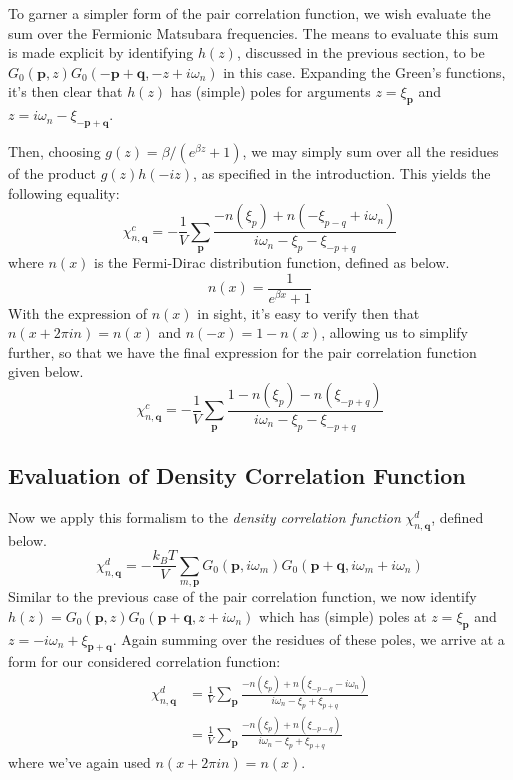 \documentclass[10pt,a4paper]{article}
\begin{document}
\begin{multicols}{2}
To garner a simpler form of the pair correlation function, we wish evaluate the sum over the Fermionic Matsubara frequencies. The means to evaluate this sum is made explicit by identifying $h(z)$, discussed in the previous section, to be $G_{0}(\mathbf{p},z)G_0(-\mathbf{p}+\mathbf{q},-z+i\omega_n)$ in this case. Expanding the Green's functions, it's then clear that $h(z)$ has (simple) poles for arguments $z=\xi_{\mathbf{p}}$ and $z=i\omega_n-\xi_{-\mathbf{p}+\mathbf{q}}$.

Then, choosing $g(z)=\beta/(e^{\beta z}+1)$, we may simply sum over all the residues of the product $g(z)h(-iz)$, as specified in the introduction. This yields the following equality:
$$
\chi_{n,\mathbf{q}}^c = -\frac{1}{V}\sum_{\mathbf{p}}\frac{-n(\xi_{p})+n(-\xi_{p-q}+i\omega_n)}{i\omega_n - \xi_{p}-\xi_{-p+q}}
$$
where $n(x)$ is the Fermi-Dirac distribution function, defined as below.
$$
n(x)=\frac{1}{e^{\beta x}+1}
$$
With the expression of $n(x)$ in sight, it's easy to verify then that  $n(x+2\pi i n  )=n(x)$ and $n(-x)=1-n(x)$, allowing us to simplify further, so that we have the final expression for the pair correlation function given below.
$$
\chi_{n,\mathbf{q}}^c = -\frac{1}{V}\sum_{\mathbf{p}}\frac{1-n(\xi_{p})-n(\xi_{-p+q})}{i\omega_n - \xi_{p}-\xi_{-p+q}}
$$
\subsection{Evaluation of Density Correlation Function}
Now we apply this formalism to the \textit{density correlation function} $\chi_{n,\mathbf{q}}^d$, defined below.\small
$$
\chi_{n,\mathbf{q}}^d = -\frac{k_BT}{V}\sum_{m,\mathbf{p}}G_{0}(\mathbf{p},i\omega_m)G_0(\mathbf{p}+\mathbf{q},i\omega_m+i\omega_n)
$$\normalsize
Similar to the previous case of the pair correlation function, we now identify $h(z)=G_{0}(\mathbf{p},z)G_0(\mathbf{p}+\mathbf{q},z+i\omega_n)$ which has (simple) poles at $z=\xi_{\mathbf{p}}$ and $z=-i\omega_n+\xi_{\mathbf{p}+\mathbf{q}}$. Again summing over the residues of these poles, we arrive at a form for our considered correlation function:
\begin{align*}
\chi_{n,\mathbf{q}}^d &= \frac{1}{V}\sum_{\mathbf{p}}\frac{-n(\xi_p)+n(\xi_{-p-q}-i\omega_n)}{i\omega_n - \xi_p + \xi_{p+q}}\\
&= \frac{1}{V}\sum_{\mathbf{p}}\frac{-n(\xi_p)+n(\xi_{-p-q})}{i\omega_n - \xi_p + \xi_{p+q}}
\end{align*}
where we've again used $n(x+2\pi i n  )=n(x)$.


\end{multicols}
\end{document}
